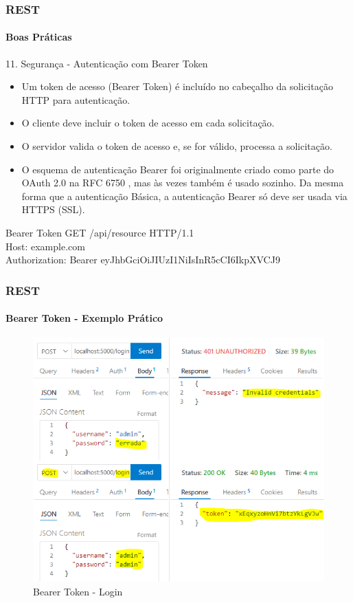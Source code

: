 \documentclass[
	9pt, %
	t, %
]{beamer}
\begin{document}
\begin{frame}
	\frametitle{REST}
	\framesubtitle{Boas Práticas}
	
	\begin{block}{{\small 11. Segurança - Autenticação com Bearer Token}}
		{ \small 
		\begin{itemize}
			\item Um token de acesso (Bearer Token) é incluído no cabeçalho da solicitação HTTP para autenticação.
			\item O cliente deve incluir o token de acesso em cada solicitação. 
			\item O servidor valida o token de acesso e, se for válido, processa a solicitação.
			\item O esquema de autenticação Bearer foi originalmente criado como parte do OAuth 2.0 na RFC 6750 , mas às vezes também é usado sozinho. Da mesma forma que a autenticação Básica, a autenticação Bearer só deve ser usada via HTTPS (SSL).
		\end{itemize}
		}
	\end{block}

	\begin{exampleblock}{Bearer Token}
		{ \small GET /api/resource HTTP/1.1 } \\
		{ \small Host: example.com } \\
		{ \small Authorization: Bearer eyJhbGciOiJIUzI1NiIsInR5cCI6IkpXVCJ9 } \\
	\end{exampleblock}

\end{frame}

\begin{frame}
	\frametitle{REST}
	\framesubtitle{Bearer Token - Exemplo Prático}

	\begin{figure}
		\includegraphics[width=0.7\linewidth]{bearer_login.png}
		\caption{Bearer Token - Login}
		\label{fig:bearer_token_login}
	\end{figure}
		
\end{frame}
\end{document}
